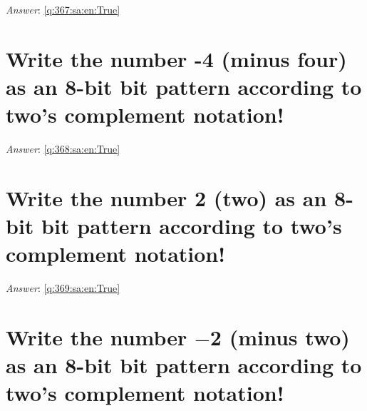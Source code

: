 \documentclass[a4paper,11pt,oneside]{book}
\begin{document}
\begin{sloppypar}
\label{q:367:sa:en:False}

\vspace{2cm}

\noindent\makebox[\textwidth]{\hrulefill}

\vspace{1cm}

\textit{Answer}: \autoref{q:367:sa:en:True}



\section{Write the number -4 (minus four) as an 8-bit bit pattern according to two's complement notation!}

\label{q:368:sa:en:False}

\vspace{2cm}

\noindent\makebox[\textwidth]{\hrulefill}

\vspace{1cm}

\textit{Answer}: \autoref{q:368:sa:en:True}



\section{Write the number 2 (two) as an 8-bit bit pattern according to two's complement notation!}

\label{q:369:sa:en:False}

\vspace{2cm}

\noindent\makebox[\textwidth]{\hrulefill}

\vspace{1cm}

\textit{Answer}: \autoref{q:369:sa:en:True}



\section{Write the number \ensuremath{-}2 (minus two) as an 8-bit bit pattern according to two's complement notation!}

\label{q:370:sa:en:False}

\vspace{2cm}

\noindent\makebox[\textwidth]{\hrulefill}

\vspace{1cm}


\end{sloppypar}
\end{document}
